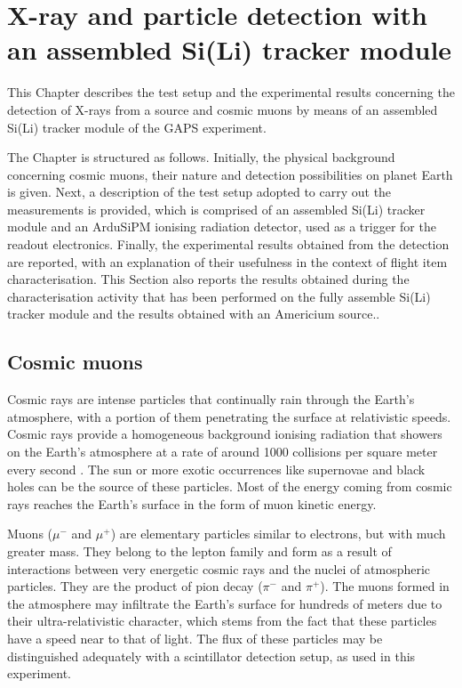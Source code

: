 \chapter{X-ray and particle detection with an assembled Si(Li) tracker module} \label{ch3}

This Chapter describes the test setup and the experimental results concerning the detection of X-rays from a  source and cosmic muons by means of an assembled Si(Li) tracker module of the GAPS experiment.

\par
The Chapter is structured as follows. Initially, the physical background concerning cosmic muons, their nature and detection possibilities on planet Earth is given. Next, a description of the test setup adopted to carry out the measurements is provided, which is comprised of an assembled Si(Li) tracker module and an ArduSiPM ionising radiation detector, used as a trigger for the readout electronics. Finally, the experimental results obtained from the detection are reported, with an explanation of their usefulness in the context of flight item characterisation. This Section also reports the results obtained during the characterisation activity that has been performed on the fully assemble Si(Li) tracker module and the results obtained with an Americium source..


\section{Cosmic muons}

Cosmic rays are intense particles that continually rain through the Earth's atmosphere, with a portion of them penetrating the surface at relativistic speeds. Cosmic rays provide a homogeneous background ionising radiation that showers on the Earth's atmosphere at a rate of around 1000 collisions per square meter every second \cite{uretsky_1997_penetration}. The sun or more exotic occurrences like supernovae and black holes can be the source of these particles. Most of the energy coming from cosmic rays reaches the Earth's surface in the form of muon kinetic energy.

\par
Muons ($\mu^{-}$ and $\mu^{+}$) are elementary particles similar to electrons, but with much greater mass. They belong to the lepton family \cite{klapdorkleingrothaus_2018_lepton} and form as a result of interactions between very energetic cosmic rays and the nuclei of atmospheric particles. They are the product of pion decay ($\pi^{-}$ and $\pi^{+}$). The muons formed in the atmosphere may infiltrate the Earth's surface for hundreds of meters due to their ultra-relativistic character, which stems from the fact that these particles have a speed near to that of light. The flux of these particles may be distinguished adequately with a scintillator detection setup, as used in this experiment.

